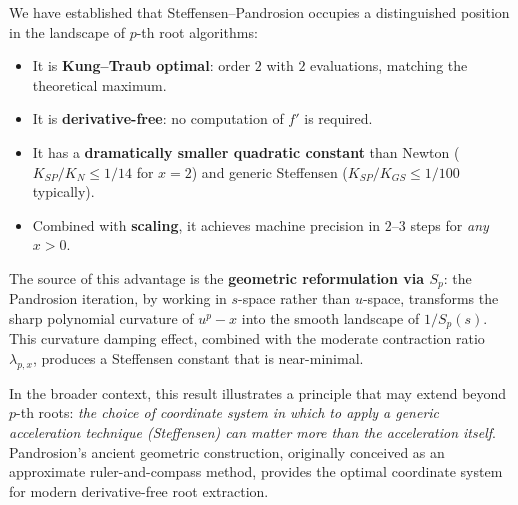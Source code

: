\documentclass[10pt,a4paper,oneside]{book}
\theoremstyle{definition}
\theoremstyle{remark}
\begin{document}
We have established that Steffensen--Pandrosion occupies a distinguished position in the landscape of $p$-th root algorithms:

\begin{itemize}
  \item It is \textbf{Kung--Traub optimal}: order $2$ with $2$ evaluations, matching the theoretical maximum.
  \item It is \textbf{derivative-free}: no computation of $f'$ is required.
  \item It has a \textbf{dramatically smaller quadratic constant} than Newton ($K_{SP}/K_N \leq 1/14$ for $x=2$) and generic Steffensen ($K_{SP}/K_{GS} \leq 1/100$ typically).
  \item Combined with \textbf{scaling}, it achieves machine precision in $2$--$3$ steps for \emph{any} $x > 0$.
\end{itemize}

\medskip

The source of this advantage is the \textbf{geometric reformulation via $S_p$}: the Pandrosion iteration, by working in $s$-space rather than $u$-space, transforms the sharp polynomial curvature of $u^p - x$ into the smooth landscape of $1/S_p(s)$.  This curvature damping effect, combined with the moderate contraction ratio $\lambda_{p,x}$, produces a Steffensen constant that is near-minimal.

\medskip

In the broader context, this result illustrates a principle that may extend beyond $p$-th roots: \emph{the choice of coordinate system in which to apply a generic acceleration technique (Steffensen) can matter more than the acceleration itself}.  Pandrosion's ancient geometric construction, originally conceived as an approximate ruler-and-compass method, provides the optimal coordinate system for modern derivative-free root extraction.
\end{document}
